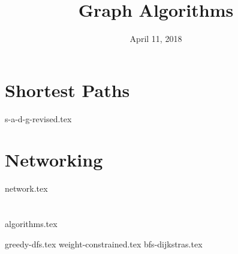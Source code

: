 \documentclass[11pt]{exam}
\title{Graph Algorithms}
\date{April 11, 2018}
\begin{document}
\maketitle

\section{Shortest Paths}
\begin{questions}
{s-a-d-g-revised.tex}
\end{questions}

\clearpage

\section{Networking}
\begin{questions}
{network.tex}
\end{questions}

\clearpage

\section{}
{algorithms.tex}
\begin{questions}
{greedy-dfs.tex}
{weight-constrained.tex}
{bfs-dijkstras.tex}
\end{questions}
\end{document}
